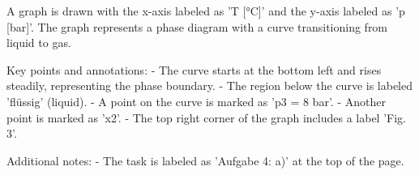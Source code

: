 A graph is drawn with the x-axis labeled as 'T [°C]' and the y-axis labeled as 'p [bar]'. The graph represents a phase diagram with a curve transitioning from liquid to gas.  

Key points and annotations:  
- The curve starts at the bottom left and rises steadily, representing the phase boundary.  
- The region below the curve is labeled 'flüssig' (liquid).  
- A point on the curve is marked as 'p3 = 8 bar'.  
- Another point is marked as 'x2'.  
- The top right corner of the graph includes a label 'Fig. 3'.  

Additional notes:  
- The task is labeled as 'Aufgabe 4: a)' at the top of the page.